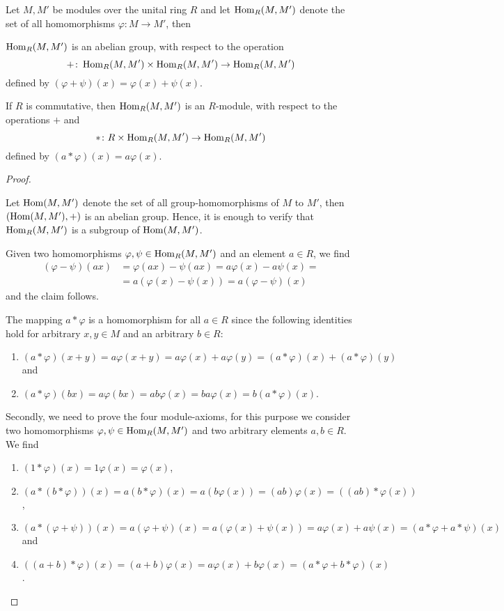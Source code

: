 \begin{pro}\label{prop.Homomorphisms are Module}
Let $M,M'$ be modules over the unital ring $R$ and let $\operatorname{\mathrm{Hom}}_R(M,M')$ denote the set of all homomorphisms $\varphi\colon M\to M'$, then
\begin{thmlist}
\item \label{prop.Homomorphisms are Group} $\operatorname{\mathrm{Hom}}_R(M,M')$ is an abelian group, with respect to the operation \[+\colon\operatorname{\mathrm{Hom}}_R(M,M')\times\operatorname{\mathrm{Hom}}_R(M,M')\to\operatorname{\mathrm{Hom}}_R(M,M')\]
defined by $(\varphi+\psi)(x)=\varphi(x)+\psi(x)$.
\item If $R$ is commutative, then $\operatorname{\mathrm{Hom}}_R(M,M')$ is an $R$-module, with respect to the operations $+$ and 
\[\ast\colon R\times\operatorname{\mathrm{Hom}}_R(M,M')\to\operatorname{\mathrm{Hom}}_R(M,M')\]
defined by $(a\ast\varphi)(x)=a\varphi(x)$.
\end{thmlist}
\end{pro}
\begin{proof}
\begin{plist}
\item Let $\operatorname{\mathrm{Hom}}(M,M')$ denote the set of all group-ho\-mo\-morph\-isms of $M$ to $M'$, then $(\operatorname{\mathrm{Hom}}(M,M'),+)$ is an abelian group. Hence, it is enough to verify that $\operatorname{\mathrm{Hom}}_R(M,M')$ is a subgroup of $\operatorname{\mathrm{Hom}}(M,M')$.

Given two homomorphisms $\varphi,\psi\in\operatorname{\mathrm{Hom}}_R(M,M')$ and an element $a\in R$, we find
\begin{align*}
(\varphi-\psi)(ax)&=\varphi(ax)-\psi(ax)=a\varphi(x)-a\psi(x)=\\
            &=a(\varphi(x)-\psi(x))=a(\varphi-\psi)(x)
\end{align*}
and the claim follows.
\item The mapping $a\ast\varphi$ is a homomorphism for all $a\in R$ since the following identities hold for arbitrary $x,y\in M$ and an arbitrary $b\in R$:
\begin{enumerate}
\item $(a\ast\varphi)(x+y)=a\varphi(x+y)=a\varphi(x)+a\varphi(y)=(a\ast\varphi)(x)+(a\ast\varphi)(y)$ and
\item $(a\ast\varphi)(bx)=a\varphi(bx)=ab\varphi(x)=ba\varphi(x)=b(a\ast\varphi)(x)$.
\end{enumerate} 


Secondly, we need to prove the four module-axioms, for this purpose we consider two homomorphisms $\varphi,\psi\in\operatorname{\mathrm{Hom}}_R(M,M')$ and two arbitrary elements $a,b\in R$. We find
\begin{enumerate}
\item $(1\ast\varphi)(x)=1\varphi(x)=\varphi(x)$,
\item $(a\ast(b\ast\varphi))(x)=a(b\ast\varphi)(x)=a(b\varphi(x))=(ab)\varphi(x)=((ab)\ast\varphi(x))$,
\item $(a\ast(\varphi+\psi))(x)=a(\varphi+\psi)(x)=a(\varphi(x)+\psi(x))=a\varphi(x)+a\psi(x)=(a\ast\varphi + a\ast\psi)(x)$ and
\item $((a+b)\ast\varphi)(x)=(a+b)\varphi(x)=a\varphi(x)+b\varphi(x)=(a\ast\varphi+b\ast\varphi)(x)$.
\end{enumerate}
\end{plist}
\end{proof}

